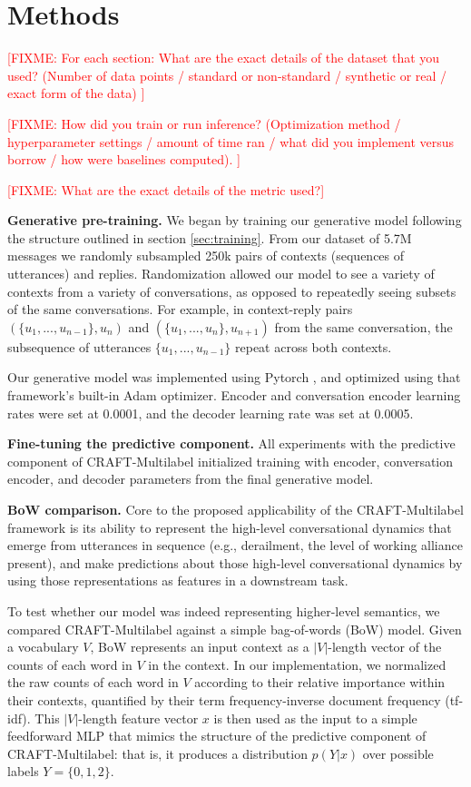 \documentclass{article}
\newcommand{\fixme}[1]{\textcolor{red}{[FIXME: #1]}}
\begin{document}
\section{Methods}
\label{sec:methods}

\fixme{For each section: What are the exact details of the dataset that you used? (Number of data points / standard or non-standard / synthetic or real / exact form of the data)
}

\fixme{
How did you train or run inference? (Optimization method / hyperparameter settings / amount of time ran / what did you implement versus borrow / how were baselines computed).
}

\fixme{What are the exact details of the metric used?}

\textbf{Generative pre-training.} We began by training our generative model following the structure outlined in section \ref{sec:training}. From our dataset of 5.7M messages we randomly subsampled 250k pairs of contexts (sequences of utterances) and replies. Randomization allowed our model to see a variety of contexts from a variety of conversations, as opposed to repeatedly seeing subsets of the same conversations. For example, in context-reply pairs $(\{u_1,...,u_{n-1}\}, u_{n})$ and $(\{u_1,...,u_{n}\}, u_{n+1})$ from the same conversation, the subsequence of utterances $\{u_1,...,u_{n-1}\}$ repeat across both contexts.

Our generative model was implemented using Pytorch \cite{paszke2019pytorch}, and optimized using that framework's built-in Adam optimizer. Encoder and conversation encoder learning rates were set at 0.0001, and the decoder learning rate was set at 0.0005.

\textbf{Fine-tuning the predictive component.} All experiments with the predictive component of CRAFT-Multilabel initialized training with encoder, conversation encoder, and decoder parameters from the final generative model.  

\textbf{BoW comparison.} Core to the proposed applicability of the CRAFT-Multilabel framework is its ability to represent the high-level conversational dynamics that emerge from utterances in sequence (e.g., derailment, the level of working alliance present), and make predictions about those high-level conversational dynamics by using those representations as features in a downstream task. 

To test whether our model was indeed representing higher-level semantics, we compared CRAFT-Multilabel against a simple bag-of-words (BoW) model. Given a vocabulary $V$, BoW represents an input context as a $|V|$-length vector of the counts of each word in $V$ in the context. In our implementation, we normalized the raw counts of each word in $V$ according to their relative importance within their contexts, quantified by their term frequency-inverse document frequency (tf-idf). This $|V|$-length feature vector $x$ is then used as the input to a simple feedforward MLP that mimics the structure of the predictive component of CRAFT-Multilabel: that is, it produces a distribution $p(Y|x)$ over possible labels $Y=\{0,1,2\}$.
\end{document}
